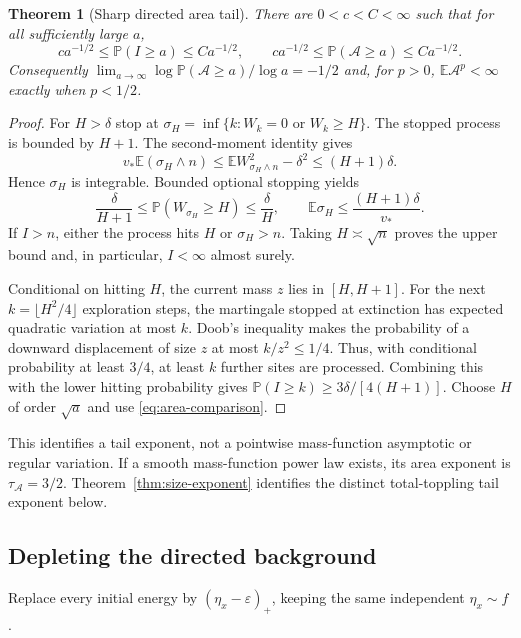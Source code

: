 \documentclass[11pt]{article}
\numberwithin{equation}{section}
\newtheorem{theorem}{Theorem}[section]
\theoremstyle{definition}
\newcommand{\E}{\mathbb E}
\newcommand{\Prob}{\mathbb P}
\begin{document}
\begin{theorem}[Sharp directed area tail]\label{thm:area-tail}
There are $0<c<C<\infty$ such that for all sufficiently large $a$,
\begin{equation}\label{eq:area-tail}
 c a^{-1/2}\le\Prob(I\ge a)\le C a^{-1/2},\qquad
 c a^{-1/2}\le\Prob(\mathcal A\ge a)\le C a^{-1/2}.
\end{equation}
Consequently $\lim_{a\to\infty}\log\Prob(\mathcal A\ge a)/\log a=-1/2$ and, for $p>0$, $\E\mathcal A^p<\infty$ exactly when $p<1/2$.
\end{theorem}
\begin{proof}
For $H>\delta$ stop at $\sigma_H=\inf\{k:W_k=0\text{ or }W_k\ge H\}$. The stopped process is bounded by $H+1$. The second-moment identity gives
\[
 v_*\E(\sigma_H\wedge n)
 \le\E W_{\sigma_H\wedge n}^2-\delta^2
 \le(H+1)\delta.
\]
Hence $\sigma_H$ is integrable. Bounded optional stopping yields
\[
 \frac\delta{H+1}\le\Prob(W_{\sigma_H}\ge H)\le\frac\delta H,
 \qquad \E\sigma_H\le\frac{(H+1)\delta}{v_*}.
\]
If $I>n$, either the process hits $H$ or $\sigma_H>n$. Taking $H\asymp\sqrt n$ proves the upper bound and, in particular, $I<\infty$ almost surely.

Conditional on hitting $H$, the current mass $z$ lies in $[H,H+1]$. For the next $k=\lfloor H^2/4\rfloor$ exploration steps, the martingale stopped at extinction has expected quadratic variation at most $k$. Doob's inequality makes the probability of a downward displacement of size $z$ at most $k/z^2\le1/4$. Thus, with conditional probability at least $3/4$, at least $k$ further sites are processed. Combining this with the lower hitting probability gives $\Prob(I\ge k)\ge3\delta/[4(H+1)]$. Choose $H$ of order $\sqrt a$ and use \eqref{eq:area-comparison}.
\end{proof}
This identifies a tail exponent, not a pointwise mass-function asymptotic or regular variation. If a smooth mass-function power law exists, its area exponent is $\tau_{\mathcal A}=3/2$. Theorem~\ref{thm:size-exponent} identifies the distinct total-toppling tail exponent below.

\subsection{Depleting the directed background}\label{sec:depletion}
Replace every initial energy by $(\eta_x-\varepsilon)_+$, keeping the same independent $\eta_x\sim f$.
\end{document}
